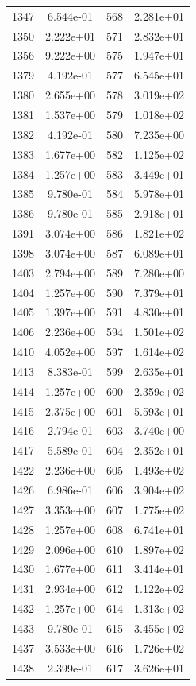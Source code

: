 \documentclass[12pt]{article}
\begin{document}
\begin{longtable}{@{}cccc@{}}
1347 & 6.544e-01 & 568 & 2.281e+01 \\
1350 & 2.222e+01 & 571 & 2.832e+01 \\
1356 & 9.222e+00 & 575 & 1.947e+01 \\
1379 & 4.192e-01 & 577 & 6.545e+01 \\
1380 & 2.655e+00 & 578 & 3.019e+02 \\
1381 & 1.537e+00 & 579 & 1.018e+02 \\
1382 & 4.192e-01 & 580 & 7.235e+00 \\
1383 & 1.677e+00 & 582 & 1.125e+02 \\
1384 & 1.257e+00 & 583 & 3.449e+01 \\
1385 & 9.780e-01 & 584 & 5.978e+01 \\
1386 & 9.780e-01 & 585 & 2.918e+01 \\
1391 & 3.074e+00 & 586 & 1.821e+02 \\
1398 & 3.074e+00 & 587 & 6.089e+01 \\
1403 & 2.794e+00 & 589 & 7.280e+00 \\
1404 & 1.257e+00 & 590 & 7.379e+01 \\
1405 & 1.397e+00 & 591 & 4.830e+01 \\
1406 & 2.236e+00 & 594 & 1.501e+02 \\
1410 & 4.052e+00 & 597 & 1.614e+02 \\
1413 & 8.383e-01 & 599 & 2.635e+01 \\
1414 & 1.257e+00 & 600 & 2.359e+02 \\
1415 & 2.375e+00 & 601 & 5.593e+01 \\
1416 & 2.794e-01 & 603 & 3.740e+00 \\
1417 & 5.589e-01 & 604 & 2.352e+01 \\
1422 & 2.236e+00 & 605 & 1.493e+02 \\
1426 & 6.986e-01 & 606 & 3.904e+02 \\
1427 & 3.353e+00 & 607 & 1.775e+02 \\
1428 & 1.257e+00 & 608 & 6.741e+01 \\
1429 & 2.096e+00 & 610 & 1.897e+02 \\
1430 & 1.677e+00 & 611 & 3.414e+01 \\
1431 & 2.934e+00 & 612 & 1.122e+02 \\
1432 & 1.257e+00 & 614 & 1.313e+02 \\
1433 & 9.780e-01 & 615 & 3.455e+02 \\
1437 & 3.533e+00 & 616 & 1.726e+02 \\
1438 & 2.399e-01 & 617 & 3.626e+01 \\

\end{longtable}
\end{document}
